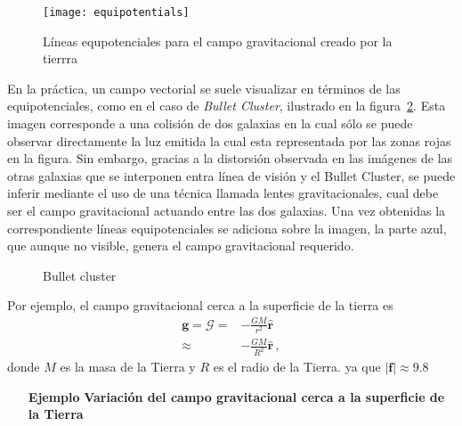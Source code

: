 \begin{frame}
  \begin{figure}
  \centering
  \texttt{[image: equipotentials]}
  \caption{Líneas equpotenciales para el campo gravitacional creado por la tierrra}
  \label{fig:equipotentials}
\end{figure}
\end{frame}

En la práctica, un campo vectorial se suele visualizar en términos de
las equipotenciales, como en el caso de \emph{Bullet Cluster},
ilustrado en la figura~\ref{fig:bullet}. Esta imagen corresponde a una
colisión de dos galaxias en la cual sólo se puede observar
directamente la luz emitida la cual esta representada por las zonas
rojas en la figura. Sin embargo, gracias a la distorsión observada en
las imágenes de las otras galaxias que se interponen entra línea de
visión y el Bullet Cluster, se puede inferir mediante el uso de una
técnica llamada lentes gravitacionales, cual debe ser el campo
gravitacional actuando entre las dos galaxias. Una vez obtenidas la
correspondiente líneas equipotenciales se adiciona sobre la imagen, la
parte azul, que aunque no visible, genera el campo gravitacional
requerido.

\begin{frame}
\begin{figure}
  \centering
  \caption{Bullet cluster}
  \label{fig:bullet}
\end{figure}
\end{frame}


Por ejemplo, el campo gravitacional cerca a la superficie de la tierra es
\begin{align}
  \mathbf{g}=\boldsymbol{\mathcal{G}}=&-\frac{GM}{r^2}\hat{\mathbf{r}}\nonumber\\
  \approx&-\frac{GM}{R^2}\hat{\mathbf{r}}\,,
\end{align}
donde $M$ es la masa de la Tierra y $R$ es el radio de la Tierra. ya que $|\mathbf{f}|\approx 9.8$


\begin{itemize}
\item[\textbf{Ejemplo}] \textbf{Variación del campo gravitacional cerca a la superficie de la Tierra} %

\end{itemize}



